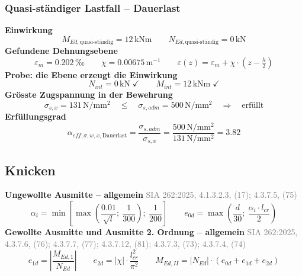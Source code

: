 \documentclass[11pt,a4paper]{article}
\newcommand{\normref}[1]{{\small\textcolor{gray}{#1}}}
\begin{document}
\subsubsection{Quasi-ständiger Lastfall – Dauerlast}
\noindent\textbf{Einwirkung}
\begin{equation*}
M_{Ed,\text{quasi-ständig}} = 12\,\mathrm{kNm} \qquad N_{Ed,\text{quasi-ständig}} = 0\,\mathrm{kN}
\end{equation*}
\noindent\textbf{Gefundene Dehnungsebene}
\begin{equation*}
\varepsilon_m = 0.202\,\text{‰} \qquad \chi = 0.00675\,\mathrm{m}^{-1} \qquad \varepsilon(z) = \varepsilon_m + \chi \cdot \left(z - \tfrac{h}{2}\right)
\end{equation*}
\noindent\textbf{Probe: die Ebene erzeugt die Einwirkung}
\begin{equation*}
N_{int} = 0\,\mathrm{kN} \;\checkmark \qquad M_{int} = 12\,\mathrm{kNm} \;\checkmark
\end{equation*}
\noindent\textbf{Grösste Zugspannung in der Bewehrung}
\begin{equation*}
\sigma_{s,x} = 131\,\mathrm{N}/\mathrm{mm}^{2} \quad \le \quad \sigma_{s,adm} = 500\,\mathrm{N}/\mathrm{mm}^{2} \quad \Rightarrow \quad \text{erfüllt}
\end{equation*}
\noindent\textbf{Erfüllungsgrad}
\begin{equation*}
\alpha_{eff,\sigma,w,x,\text{Dauerlast}} = \frac{\sigma_{s,adm}}{\sigma_{s,x}} = \frac{500\,\mathrm{N}/\mathrm{mm}^{2}}{131\,\mathrm{N}/\mathrm{mm}^{2}} = 3.82
\end{equation*}
\subsection{Knicken}
\noindent\textbf{Ungewollte Ausmitte – allgemein} \hfill \normref{SIA 262:2025, 4.1.3.2.3, (17); 4.3.7.5, (75)}
\begin{equation*}
\alpha_i = \min\left[\max\left(\frac{0.01}{\sqrt{l}};\ \frac{1}{300}\right);\ \frac{1}{200}\right] \qquad e_{0d} = \max\left(\frac{d}{30};\ \frac{\alpha_i \cdot l_{cr}}{2}\right)
\end{equation*}
\noindent\textbf{Gewollte Ausmitte und Ausmitte 2. Ordnung – allgemein} \hfill \normref{SIA 262:2025, 4.3.7.6, (76); 4.3.7.7, (77); 4.3.7.12, (81); 4.3.7.3, (73); 4.3.7.4, (74)}
\begin{equation*}
e_{1d} = \left|\frac{M_{Ed,1}}{N_{Ed}}\right| \qquad e_{2d} = \left|\chi\right| \cdot \frac{l_{cr}^{2}}{\pi^{2}} \qquad M_{Ed,II} = \left|N_{Ed}\right| \cdot \left(e_{0d} + e_{1d} + e_{2d}\right)
\end{equation*}
\end{document}
